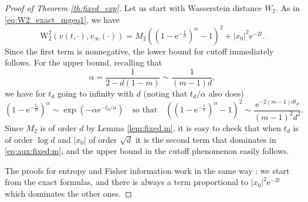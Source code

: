 \documentclass[10pt,reqno]{amsart}
\numberwithin{equation}{section}
\begin{document}
\begin{proof}[Proof of Theorem \ref{th:fixed_exp}]
    Let us start with Wasserstein distance $W_2$. As in \eqref{eq:W2_exact_mgeq1}, we have
    \begin{equation} \label{eq:aux:fixed:m}
     \mathrm{W}_2^2(v(t,\cdot),v_\infty(\cdot))
    =M_2((1-\mathrm{e}^{-\frac{t}{\alpha}})^\alpha-1)^2+|x_0|^2\mathrm{e}^{-2t}.
    \end{equation}
    Since the first term is nonnegative, the lower bound for cutoff immediately follows. For the upper bound, recalling that 
    \[
    \alpha = \frac{1}{2-d(1-m)} \sim \frac{1}{(m-1)d},
    \]
    we have for $t_d$ going to infinity with $d$ (noting that $t_d/\alpha$ also does)
    \[
    (1-\mathrm{e}^{-\frac{t_d}{\alpha}})^\alpha \sim \exp\left(-\alpha\mathrm{e}^{-t_d/\alpha}\right)
    \quad\text{so that}\quad
    \left((1-\mathrm{e}^{-\frac{t}{\alpha}})^\alpha-1\right)^2 \sim \frac{\mathrm{e}^{-2(m-1)d t_d}}{(m-1)^2d^2}.
    \]
    Since $M_2$ is of order $d$ by Lemma \ref{lem:fixed.m}, it is easy to check that when $t_d$ is of order $\log d$ and $|x_0|$ of order $\sqrt{d}$ it is the second term that dominates in \eqref{eq:aux:fixed:m}, and the upper bound in the cutoff phenomenon easily follows. 

    The proofs for entropy and Fisher information work in the same way : we start from the exact formulas, and there is always a term proportional to $|x_0|^2\mathrm{e}^{-2t}$ which dominates the other ones. 
\end{proof}
\end{document}
